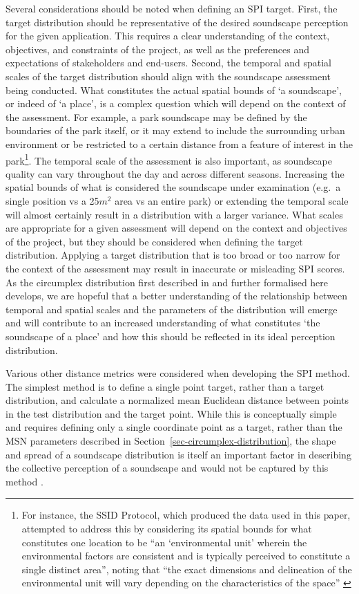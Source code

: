 \documentclass[
  authoryear,
  preprint,
  1p]{elsarticle}
\begin{document}
Several considerations should be noted when defining an SPI target.
First, the target distribution should be representative of the desired
soundscape perception for the given application. This requires a clear
understanding of the context, objectives, and constraints of the
project, as well as the preferences and expectations of stakeholders and
end-users. Second, the temporal and spatial scales of the target
distribution should align with the soundscape assessment being
conducted. What constitutes the actual spatial bounds of `a soundscape',
or indeed of `a place', is a complex question which will depend on the
context of the assessment. For example, a park soundscape may be defined
by the boundaries of the park itself, or it may extend to include the
surrounding urban environment or be restricted to a certain distance
from a feature of interest in the park\footnote{For instance, the SSID
  Protocol, which produced the data used in this paper, attempted to
  address this by considering its spatial bounds for what constitutes
  one location to be ``an `environmental unit' wherein the environmental
  factors are consistent and is typically perceived to constitute a
  single distinct area'', noting that ``the exact dimensions and
  delineation of the environmental unit will vary depending on the
  characteristics of the space'' \citep{Mitchell2020Soundscape}}. The
temporal scale of the assessment is also important, as soundscape
quality can vary throughout the day and across different seasons.
Increasing the spatial bounds of what is considered the soundscape under
examination (e.g.~a single position vs a 25\(m^2\) area vs an entire
park) or extending the temporal scale will almost certainly result in a
distribution with a larger variance. What scales are appropriate for a
given assessment will depend on the context and objectives of the
project, but they should be considered when defining the target
distribution. Applying a target distribution that is too broad or too
narrow for the context of the assessment may result in inaccurate or
misleading SPI scores. As the circumplex distribution first described in
\citet{Mitchell2022How} and further formalised here develops, we are
hopeful that a better understanding of the relationship between temporal
and spatial scales and the parameters of the distribution will emerge
and will contribute to an increased understanding of what constitutes
`the soundscape of a place' and how this should be reflected in its
ideal perception distribution.

Various other distance metrics were considered when developing the SPI
method. The simplest method is to define a single point target, rather
than a target distribution, and calculate a normalized mean Euclidean
distance between points in the test distribution and the target point.
While this is conceptually simple and requires defining only a single
coordinate point as a target, rather than the MSN parameters described
in Section~\ref{sec-circumplex-distribution}, the shape and spread of a
soundscape distribution is itself an important factor in describing the
collective perception of a soundscape and would not be captured by this
method \citep{Mitchell2022How}.
\end{document}
